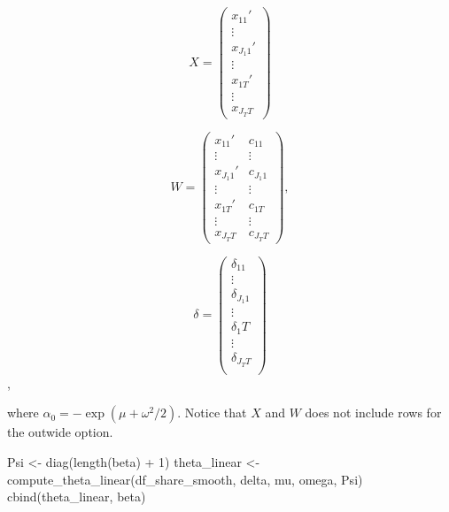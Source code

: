 \documentclass[
]{book}
\newenvironment{Shaded}{\begin{snugshade}}{\end{snugshade}}
\newcommand{\DecValTok}[1]{\textcolor[rgb]{0.00,0.00,0.81}{#1}}
\newcommand{\FunctionTok}[1]{\textcolor[rgb]{0.00,0.00,0.00}{#1}}
\newcommand{\NormalTok}[1]{#1}
\newcommand{\OtherTok}[1]{\textcolor[rgb]{0.56,0.35,0.01}{#1}}
\newcommand{\SpecialCharTok}[1]{\textcolor[rgb]{0.00,0.00,0.00}{#1}}
\begin{document}
\begin{equation}
X = 
\begin{pmatrix}
x_{11}'\\
\vdots \\
x_{J_1 1}'\\
\vdots \\
x_{1T}' \\
\vdots \\
x_{J_T T} 
\end{pmatrix}
\end{equation}

\begin{equation}
W = 
\begin{pmatrix}
x_{11}' & c_{11}\\
\vdots & \vdots \\
x_{J_1 1}' & c_{J_1 1}\\
\vdots & \vdots \\
x_{1T}' & c_{1T}\\
\vdots & \vdots \\
x_{J_T T} & c_{J_T T}
\end{pmatrix},
\end{equation}

\begin{equation}
\delta =
\begin{pmatrix}
\delta_11\\
\vdots\\
\delta_{J_1 1}\\
\vdots\\
\delta_1T\\
\vdots\\
\delta_{J_T T}\\
\end{pmatrix}
\end{equation},

where \(\alpha_0 = - \exp(\mu + \omega^2/2)\). Notice that \(X\) and \(W\) does not include rows for the outwide option.

\begin{Shaded}
\begin{Highlighting}[]
\NormalTok{Psi }\OtherTok{\textless{}{-}} \FunctionTok{diag}\NormalTok{(}\FunctionTok{length}\NormalTok{(beta) }\SpecialCharTok{+} \DecValTok{1}\NormalTok{)}
\NormalTok{theta\_linear }\OtherTok{\textless{}{-}}
  \FunctionTok{compute\_theta\_linear}\NormalTok{(df\_share\_smooth, delta, mu, omega, Psi) }
\FunctionTok{cbind}\NormalTok{(theta\_linear, beta)}
\end{Highlighting}
\end{Shaded}
\end{document}

